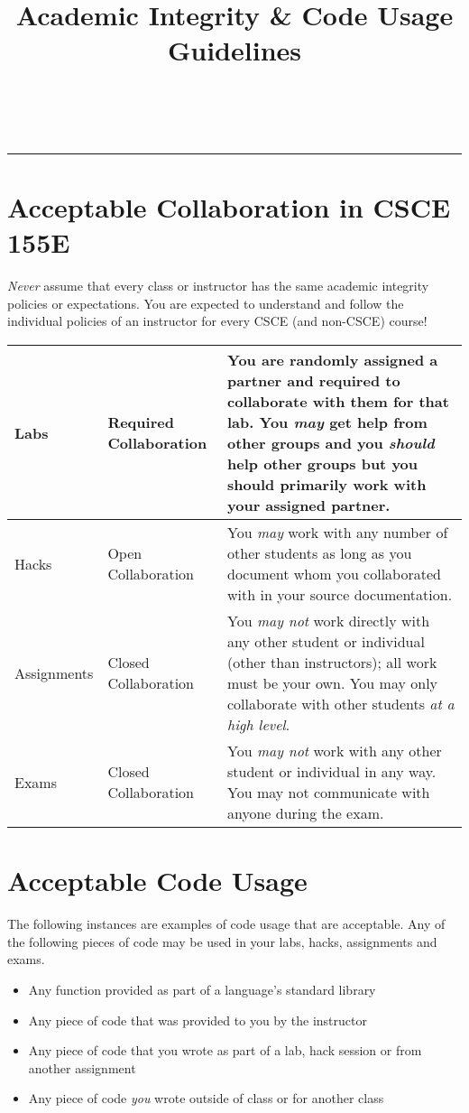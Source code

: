 \documentclass[12pt]{scrartcl}
\title{Academic Integrity \& Code Usage Guidelines}\let\Title\@title
\subtitle{Computer Science I\\
{\small
\vskip.5cm
Department of Computer Science \& Engineering \\
University of Nebraska--Lincoln}
\vskip-1cm}
\date{~}
\begin{document}
\maketitle
\vskip-1.5cm
\hrule

\section*{Acceptable Collaboration in CSCE 155E}

\emph{Never} assume that every class or instructor has the same academic 
integrity policies or expectations.  You are expected to understand and 
follow the individual policies of an instructor for every CSCE (and non-CSCE)
course!

\begin{center}
\begin{tabular}{|l|l|p{8cm}|}
\hline
Labs & Required Collaboration & You are randomly assigned a partner and required to collaborate with them for that lab.  You \emph{may} get help from other groups and
you \emph{should} help other groups but you should primarily work with your assigned partner. \\
\hline
Hacks & Open Collaboration & You \emph{may} work with any number of other students as long as you document whom you collaborated with in your source documentation.\\
\hline
Assignments & Closed Collaboration & You \emph{may not} work directly with any other student or individual (other than instructors); all work must be your own.  You may only collaborate with other students \emph{at a high level}.  \\
\hline
Exams & Closed Collaboration & You \emph{may not} work with any other student or individual in any way.  You may not communicate with anyone during the exam.\\
\hline
\end{tabular}
\end{center}

\section*{Acceptable Code Usage}

The following instances are examples of code usage that are acceptable.
Any of the following pieces of code may be used in your labs, hacks, assignments
and exams.

\begin{itemize}
  \item Any function provided as part of a language's standard library
  \item Any piece of code that was provided to you by the instructor
  \item Any piece of code that you wrote as part of a lab, hack session or from another assignment
  \item Any piece of code \emph{you} wrote outside of class or for another class
\end{itemize}
\end{document}
